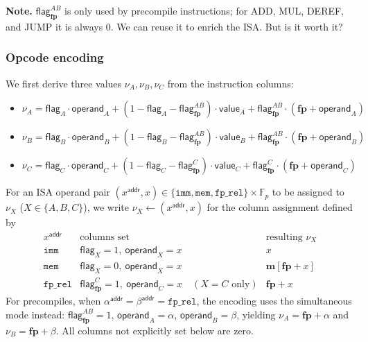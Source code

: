 \documentclass{article}
\theoremstyle{definition}
\newcommand{\Fp}{\mathbb F_p}
\begin{document}
\textbf{Note.} $\textsf{flag}^{AB}_\textbf{fp}$ is only used by precompile instructions; for ADD, MUL, DEREF, and JUMP it is always 0. We can reuse it to enrich the ISA. But is it worth it?


\subsubsection{Opcode encoding}\label{sec:opcode-encoding}

We first derive three values $\nu_A, \nu_B, \nu_C$ from the instruction columns:
\begin{itemize}
    \item $\nu_A = \textsf{flag}_A \cdot \textsf{operand}_A + (1 - \textsf{flag}_A - \textsf{flag}^{AB}_\textbf{fp}) \cdot \textsf{value}_A + \textsf{flag}^{AB}_\textbf{fp} \cdot (\textbf{fp} + \textsf{operand}_A)$
    \item $\nu_B = \textsf{flag}_B \cdot \textsf{operand}_B + (1 - \textsf{flag}_B - \textsf{flag}^{AB}_\textbf{fp}) \cdot \textsf{value}_B + \textsf{flag}^{AB}_\textbf{fp} \cdot (\textbf{fp} + \textsf{operand}_B)$
    \item $\nu_C = \textsf{flag}_C \cdot \textsf{operand}_C + (1 - \textsf{flag}_C - \textsf{flag}^{C}_\textbf{fp}) \cdot \textsf{value}_C + \textsf{flag}^{C}_\textbf{fp} \cdot (\textbf{fp} + \textsf{operand}_C)$
\end{itemize}

For an ISA operand pair $(x^\textsf{addr}, x) \in \{\texttt{imm}, \texttt{mem}, \texttt{fp\_rel}\} \times \Fp$ to be assigned to $\nu_X$ ($X \in \{A, B, C\}$), we write $\nu_X \!\leftarrow\! (x^\textsf{addr}, x)$ for the column assignment defined by
\[
\begin{array}{c|ll}
x^\textsf{addr} & \text{columns set} & \text{resulting }\nu_X \\
\hline
\texttt{imm} & \textsf{flag}_X = 1,\ \textsf{operand}_X = x & x \\
\texttt{mem} & \textsf{flag}_X = 0,\ \textsf{operand}_X = x & \textbf{m}[\textbf{fp} + x] \\
\texttt{fp\_rel} & \textsf{flag}^C_\textbf{fp} = 1,\ \textsf{operand}_C = x \quad (X = C \text{ only}) & \textbf{fp} + x
\end{array}
\]
For precompiles, when $\alpha^\textsf{addr} = \beta^\textsf{addr} = \texttt{fp\_rel}$, the encoding uses the simultaneous mode instead: $\textsf{flag}^{AB}_\textbf{fp} = 1$, $\textsf{operand}_A = \alpha$, $\textsf{operand}_B = \beta$, yielding $\nu_A = \textbf{fp} + \alpha$ and $\nu_B = \textbf{fp} + \beta$. All columns not explicitly set below are zero.
\end{document}
